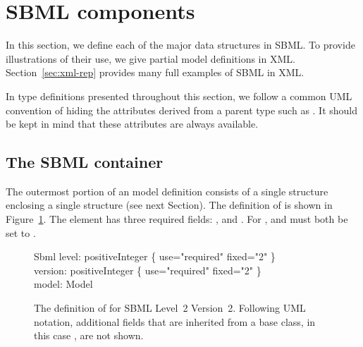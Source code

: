 
\section{SBML components}
\label{sec:elements}

In this section, we define each of the major data structures in
SBML. To provide illustrations of their use, we give partial model
definitions in XML.  Section~\ref{sec:xml-rep} provides many full
examples of SBML in XML.

In type definitions presented throughout this section, we follow a
common UML convention of hiding the attributes derived from a
parent type such as \SBase.  It should be kept in mind that these
attributes are always available.


\subsection{The SBML container}
\label{sec:sbml}

The outermost portion of an \sbmltwotwo model definition consists
of a single \Sbml structure enclosing a single \Model structure
(see next Section).  The definition of \Sbml is shown in
Figure~\ref{fig:sbml}.  The element has three required fields:
,  and .  For
\sbmltwotwo,  and  must both be set to
.

\begin{figure}[htb]
  \centering
  \small
  \vspace*{-1ex}
  \begin{classbox}{Sbml}
    level: positiveInteger \{ use="required" fixed="2" \}                 \\
    version: positiveInteger \{ use="required" fixed="2" \} \\
    model: Model                                            \\
  \end{classbox}
  \caption{The definition of \Sbml for SBML Level~2
    Version~2.  Following UML notation, additional
    fields that are inherited from a base class, in this case
    \SBase, are not shown.}
  \label{fig:sbml}
\end{figure}

